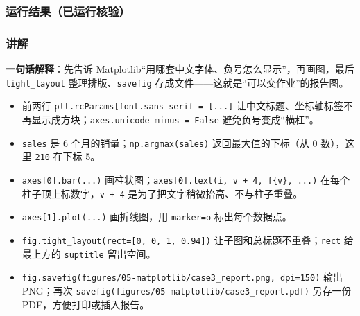 \subsubsection{运行结果（已运行核验）}\label{ux8fd0ux884cux7ed3ux679cux5df2ux8fd0ux884cux6838ux9a8c-21}

\begin{Shaded}
\begin{Highlighting}[]
\end{Highlighting}
\end{Shaded}

\subsubsection{讲解}\label{ux8bb2ux89e3-21}

\textbf{一句话解释}：先告诉
Matplotlib``用哪套中文字体、负号怎么显示''，再画图，最后
\texttt{tight\_layout} 整理排版、\texttt{savefig}
存成文件------这就是``可以交作业''的报告图。

\begin{itemize}
\tightlist
\item
  前两行
  \texttt{plt.rcParams{[}\textquotesingle{}font.sans-serif\textquotesingle{}{]}\ =\ {[}...{]}}
  让中文标题、坐标轴标签不再显示成方块；\texttt{axes.unicode\_minus\ =\ False}
  避免负号变成``横杠''。
\item
  \texttt{sales} 是 6 个月的销量；\texttt{np.argmax(sales)}
  返回最大值的下标（从 0 数），这里 \texttt{210} 在下标 5。
\item
  \texttt{axes{[}0{]}.bar(...)}
  画柱状图；\texttt{axes{[}0{]}.text(i,\ v\ +\ 4,\ f\textquotesingle{}\{v\}\textquotesingle{},\ ...)}
  在每个柱子顶上标数字，\texttt{v\ +\ 4}
  是为了把文字稍微抬高、不与柱子重叠。
\item
  \texttt{axes{[}1{]}.plot(...)} 画折线图，用
  \texttt{marker=\textquotesingle{}o\textquotesingle{}} 标出每个数据点。
\item
  \texttt{fig.tight\_layout(rect={[}0,\ 0,\ 1,\ 0.94{]})}
  让子图和总标题不重叠；\texttt{rect} 给最上方的 \texttt{suptitle}
  留出空间。
\item
  \texttt{fig.savefig(\textquotesingle{}figures/05-matplotlib/case3\_report.png\textquotesingle{},\ dpi=150)}
  输出 PNG；再次
  \texttt{savefig(\textquotesingle{}figures/05-matplotlib/case3\_report.pdf\textquotesingle{})}
  另存一份 PDF，方便打印或插入报告。
\end{itemize}


